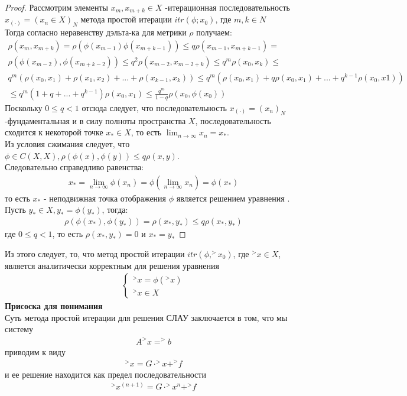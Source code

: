 \documentclass[__main__.tex]{subfiles}
\begin{document}
\begin{proof}
Рассмотрим элементы $x_m,x_{m+k} \in X$ -итерационная последовательность $x_{(\cdot)} = (x_n \in X)_N$ метода простой итерации $itr(\phi;x_0)$, где $m,k \in N$\\
Тогда согласно неравенству дэльта-ка для метрики $\rho$ получаем:
\begin{gather}
\rho(x_m,x_{m+k}) = \rho(\phi(x_{m-1})\phi(x_{m+k-1})) \leq q\rho(x_{m-1},x_{m+k-1}) = \\
\rho(\phi(x_{m-2}),\phi(x_{m+k-2})) \leq q^2\rho(x_{m-2},x_{m-2+k}) \leq q^m\rho(x_0,x_k) \leq \\ q^m (\rho(x_0,x_1)+\rho(x_1,x_2)+...+\rho(x_{k-1},x_k)) \leq q^m(\rho(x_0,x_1)+q\rho(x_0,x_1)+...+q^{k-1}\rho(x_0,x1)) \\ \leq q^m(1+q+...+q^{k-1})\rho(x_0,x_1) \leq \frac{q^m}{1-q}\rho(x_0,\phi(x_0))
\end{gather}
Поскольку $0\leq q <1$ отсюда следует, что последовательность $x_{(\cdot)} = (x_n)_N$ -фундаментальная и в силу полноты пространства $X$, последовательность сходится к некоторой точке $x_* \in X$, то есть $\lim_{n \to \infty} x_n = x_*$.\\
Из условия сжимания следует, что $\phi \in C(X,X), \rho(\phi(x),\phi(y)) \leq q\rho(x,y)$.\\
Следовательно справедливо равенства:
\begin{gather}
x_* = \lim_{n \to \infty} \phi(x_n) = \phi(\lim_{n \to \infty}x_n) = \phi(x_*)
\end{gather}
то есть $x_*$ - неподвижная точка отображения $\phi$ является решением уравнения .\\
Пусть $y_* \in X, y_* = \phi(y_*)$, тогда:
\begin{gather}
\rho(\phi(x_*),\phi(y_*)) = \rho(x_*,y_*) \leq q\rho(x_*,y_*)
\end{gather}
где $0 \leq q < 1$, то есть $\rho(x_*,y_*) = 0$ и $x_* = y_*$
\end{proof}
Из этого следует, то, что метод простой итерации $itr(\phi,^>x_0)$, где $^>x \in X$, является аналитически корректным для решения уравнения 
\begin{gather}
\begin{cases}
^>x = \phi(^>x)\\
^>x \in X
\end{cases}
\end{gather}
\textbf{Присоска для понимания}\\
Суть метода простой итерации для решения СЛАУ заключается в том, что мы систему
\begin{gather}
A^>x = ^>b
\end{gather}
приводим к виду
\begin{gather}
^>x = G\cdot ^>x + ^>f
\end{gather}
и ее решение находится как предел последовательности
\begin{gather}
^>x^{(n+1)} = G\cdot ^>x^n + ^>f
\end{gather}
\end{document}
